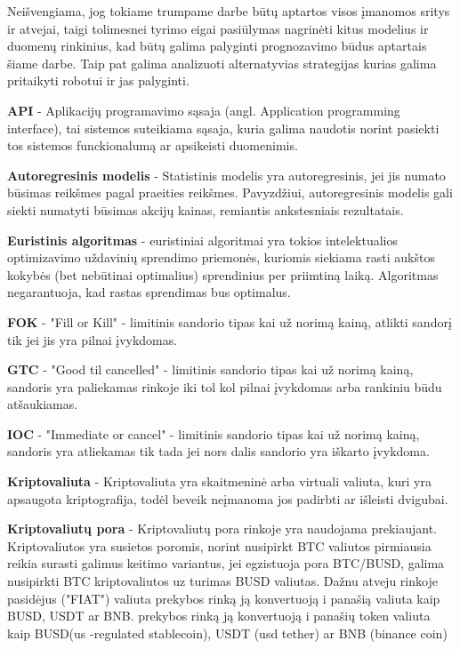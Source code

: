 \documentclass{VUMIFInfKursinis}
\begin{document}
Neišvengiama, jog tokiame trumpame darbe būtų aptartos visos įmanomos sritys ir atvejai, taigi tolimesnei tyrimo eigai pasiūlymas nagrinėti kitus modelius
ir duomenų rinkinius, kad būtų galima palyginti prognozavimo būdus aptartais šiame darbe. Taip pat galima analizuoti alternatyvias strategijas kurias galima
pritaikyti robotui ir jas palyginti. 


\textbf{API} - Aplikacijų programavimo sąsaja (angl. Application programming interface), tai sistemos suteikiama sąsaja, kuria galima naudotis norint pasiekti tos sistemos
funckionalumą ar apsikeisti duomenimis.

\textbf{Autoregresinis modelis} - Statistinis modelis yra autoregresinis, jei jis numato būsimas reikšmes pagal praeities reikšmes. Pavyzdžiui, autoregresinis modelis gali
siekti numatyti būsimas akcijų kainas, remiantis ankstesniais rezultatais.

\textbf{Euristinis algoritmas} - euristiniai algoritmai yra tokios intelektualios optimizavimo uždavinių sprendimo priemonės, kuriomis siekiama rasti aukštos
kokybės (bet nebūtinai optimalius) sprendinius per priimtiną laiką. Algoritmas negarantuoja, kad rastas sprendimas bus optimalus. \cite{misevivcius2009euristiniku}

\textbf{FOK} - "Fill or Kill" - limitinis sandorio tipas kai už norimą kainą, atlikti sandorį tik jei jis yra pilnai įvykdomas.

\textbf{GTC} - "Good til cancelled" - limitinis sandorio tipas kai už norimą kainą, sandoris yra paliekamas rinkoje iki tol kol pilnai įvykdomas arba rankiniu būdu atšaukiamas.

\textbf{IOC} - "Immediate or cancel" - limitinis sandorio tipas kai už norimą kainą, sandoris yra atliekamas tik tada jei nors dalis sandorio yra iškarto įvykdoma.

\textbf{Kriptovaliuta} - Kriptovaliuta yra skaitmeninė arba virtuali valiuta, kuri yra apsaugota kriptografija, todėl beveik neįmanoma jos padirbti ar išleisti dvigubai.

\textbf{Kriptovaliutų pora} - Kriptovaliutų pora rinkoje yra naudojama prekiaujant. Kriptovaliutos yra susietos poromis, norint nusipirkt BTC valiutos pirmiausia reikia surasti 
galimus keitimo variantus, jei egzistuoja pora BTC/BUSD, galima nusipirkti BTC kriptovaliutos uz turimas BUSD valiutas. Dažnu atveju rinkoje pasidėjus ("FIAT") valiuta
prekybos rinką ją konvertuoją i panašią valiuta kaip BUSD, USDT ar BNB.
prekybos rinką ją konvertuoją i panašių token valiuta kaip BUSD(us -regulated stablecoin), USDT (usd tether) ar BNB (binance coin)
\end{document}
